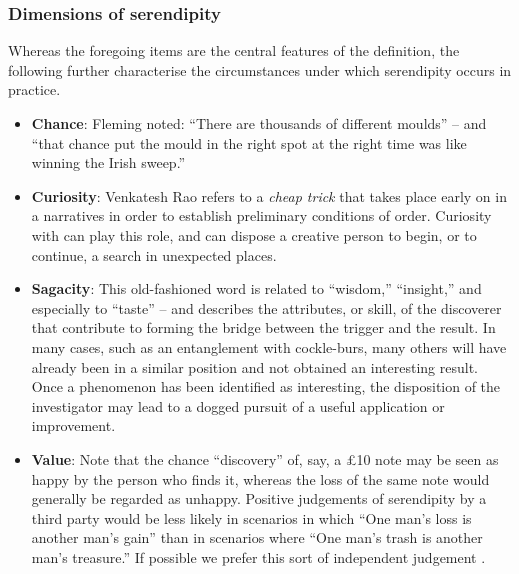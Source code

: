 \subsubsection*{Dimensions of serendipity}

Whereas the foregoing items are the central features of the
definition, the following further characterise the circumstances under
which serendipity occurs in practice.

\begin{itemize}
\item \textbf{Chance}: Fleming \citeyear{fleming} noted: ``There are
  thousands of different moulds'' -- and ``that chance put the mould
  in the right spot at the right time was like winning the Irish
  sweep.''
%
\item \textbf{Curiosity}: Venkatesh Rao \citeyear{rao2011tempo} refers
  to a \emph{cheap trick} that takes place early on in a narratives in
  order to establish preliminary conditions of order.  Curiosity with
  can play this role, and can dispose a creative person to begin, or
  to continue, a search in unexpected places.
%
\item \textbf{Sagacity}: This old-fashioned word is related to
  ``wisdom,'' ``insight,'' and especially to ``taste'' -- and
  describes the attributes, or skill, of the discoverer that
  contribute to forming the bridge between the trigger and the result.
  In many cases, such as an entanglement with cockle-burs, many others
  will have already been in a similar position and not obtained an
  interesting result.  Once a phenomenon has been identified as
  interesting, the disposition of the investigator may lead to a
  dogged pursuit of a useful application or improvement.
%
\item \textbf{Value}: Note that the chance ``discovery'' of, say, a
  \pounds 10 note may be seen as happy by the person who finds it,
  whereas the loss of the same note would generally be regarded as
  unhappy.  Positive judgements of serendipity by a third party would
  be less likely in scenarios in which ``One man's loss is another
  man's gain'' than in scenarios where ``One man's trash is another
  man's treasure.''  If possible we prefer this sort of independent
  judgement \cite{jordanous:12}.
%
\end{itemize}

